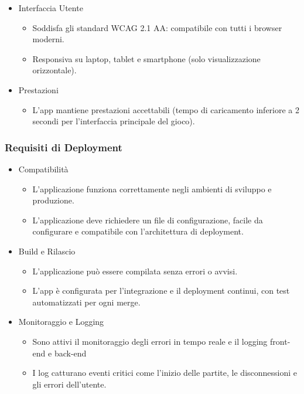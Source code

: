 \documentclass{article}
\begin{document}
\begin{itemize}
    \item Interfaccia Utente
    \begin{itemize}
        \item Soddisfa gli standard WCAG 2.1 AA: compatibile con tutti i browser moderni.
        \item Responsiva su laptop, tablet e smartphone (solo visualizzazione orizzontale).
    \end{itemize}

    \item Prestazioni
    \begin{itemize}
        \item L'app mantiene prestazioni accettabili (tempo di caricamento inferiore a 2 secondi per l'interfaccia principale del gioco).
    \end{itemize}
\end{itemize}

\subsubsection{Requisiti di Deployment}
\begin{itemize}
    \item Compatibilità
    \begin{itemize}
        \item L'applicazione funziona correttamente negli ambienti di sviluppo e produzione.
        \item L'applicazione deve richiedere un file di configurazione, facile da configurare e compatibile con l'architettura di deployment.
    \end{itemize}

    \item Build e Rilascio
    \begin{itemize}
        \item L'applicazione può essere compilata senza errori o avvisi.
        \item L'app è configurata per l'integrazione e il deployment continui, con test automatizzati per ogni merge.
    \end{itemize}

    \item Monitoraggio e Logging
    \begin{itemize}
        \item Sono attivi il monitoraggio degli errori in tempo reale e il logging front-end e back-end
        \item I log catturano eventi critici come l'inizio delle partite, le disconnessioni e gli errori dell'utente.
    \end{itemize}
\end{itemize}
\end{document}
